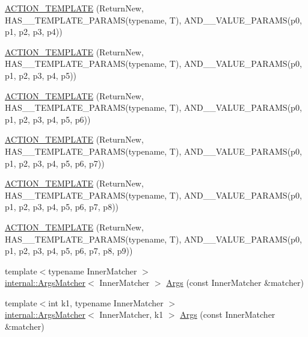 \begin{DoxyCompactItemize}
\hyperlink{namespacetesting_a0c03444379adfb849db243829946c1ed}{A\+C\+T\+I\+O\+N\+\_\+\+T\+E\+M\+P\+L\+A\+TE} (Return\+New, H\+A\+S\+\_\+\_\+\+T\+E\+M\+P\+L\+A\+T\+E\+\_\+\+P\+A\+R\+A\+MS(typename, T), A\+N\+D\+\_\+\_\+\+V\+A\+L\+U\+E\+\_\+\+P\+A\+R\+A\+MS(p0, p1, p2, p3, p4))
\item 
\hyperlink{namespacetesting_a2ef1b31693ee2be0bb93602b375fb9ce}{A\+C\+T\+I\+O\+N\+\_\+\+T\+E\+M\+P\+L\+A\+TE} (Return\+New, H\+A\+S\+\_\+\_\+\+T\+E\+M\+P\+L\+A\+T\+E\+\_\+\+P\+A\+R\+A\+MS(typename, T), A\+N\+D\+\_\+\_\+\+V\+A\+L\+U\+E\+\_\+\+P\+A\+R\+A\+MS(p0, p1, p2, p3, p4, p5))
\item 
\hyperlink{namespacetesting_a7b4cfa09367e9938561eeca5a105d183}{A\+C\+T\+I\+O\+N\+\_\+\+T\+E\+M\+P\+L\+A\+TE} (Return\+New, H\+A\+S\+\_\+\_\+\+T\+E\+M\+P\+L\+A\+T\+E\+\_\+\+P\+A\+R\+A\+MS(typename, T), A\+N\+D\+\_\+\_\+\+V\+A\+L\+U\+E\+\_\+\+P\+A\+R\+A\+MS(p0, p1, p2, p3, p4, p5, p6))
\item 
\hyperlink{namespacetesting_a76d58331453ee0a2eb75a5992e35197b}{A\+C\+T\+I\+O\+N\+\_\+\+T\+E\+M\+P\+L\+A\+TE} (Return\+New, H\+A\+S\+\_\+\_\+\+T\+E\+M\+P\+L\+A\+T\+E\+\_\+\+P\+A\+R\+A\+MS(typename, T), A\+N\+D\+\_\+\_\+\+V\+A\+L\+U\+E\+\_\+\+P\+A\+R\+A\+MS(p0, p1, p2, p3, p4, p5, p6, p7))
\item 
\hyperlink{namespacetesting_adfb5791a941ec1f2a2f8067fd9ac7667}{A\+C\+T\+I\+O\+N\+\_\+\+T\+E\+M\+P\+L\+A\+TE} (Return\+New, H\+A\+S\+\_\+\_\+\+T\+E\+M\+P\+L\+A\+T\+E\+\_\+\+P\+A\+R\+A\+MS(typename, T), A\+N\+D\+\_\+\_\+\+V\+A\+L\+U\+E\+\_\+\+P\+A\+R\+A\+MS(p0, p1, p2, p3, p4, p5, p6, p7, p8))
\item 
\hyperlink{namespacetesting_a3934a47f6125504c939a3573b7fc55c4}{A\+C\+T\+I\+O\+N\+\_\+\+T\+E\+M\+P\+L\+A\+TE} (Return\+New, H\+A\+S\+\_\+\_\+\+T\+E\+M\+P\+L\+A\+T\+E\+\_\+\+P\+A\+R\+A\+MS(typename, T), A\+N\+D\+\_\+\_\+\+V\+A\+L\+U\+E\+\_\+\+P\+A\+R\+A\+MS(p0, p1, p2, p3, p4, p5, p6, p7, p8, p9))
\item 
{\footnotesize template$<$typename Inner\+Matcher $>$ }\\\hyperlink{classtesting_1_1internal_1_1_args_matcher}{internal\+::\+Args\+Matcher}$<$ Inner\+Matcher $>$ \hyperlink{namespacetesting_aaca153f67b689b8b9d5b8c67ecf8cee4}{Args} (const Inner\+Matcher \&matcher)
\item 
{\footnotesize template$<$int k1, typename Inner\+Matcher $>$ }\\\hyperlink{classtesting_1_1internal_1_1_args_matcher}{internal\+::\+Args\+Matcher}$<$ Inner\+Matcher, k1 $>$ \hyperlink{namespacetesting_af67bac6da407df7586f60cfa2c9b602d}{Args} (const Inner\+Matcher \&matcher)

\end{DoxyCompactItemize}
